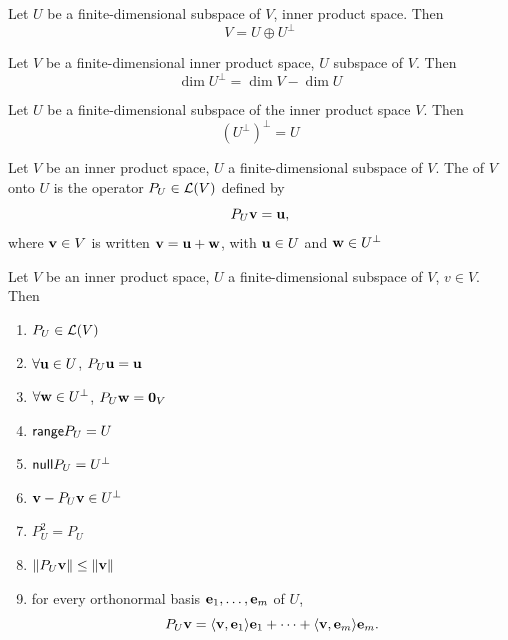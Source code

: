 \documentclass[aspectratio=169]{beamer}
\begin{document}
\begin{frame}
\begin{theorem}
Let $U$ be a finite-dimensional subspace of $V$, inner product space. Then
\[
V=U\oplus U^\perp 
\]
\end{theorem}

\begin{theorem}
Let $V$ be a finite-dimensional inner product space, $U$ subspace of $V$. Then
\[
\dim U^\perp=\dim V-\dim U
\]
\end{theorem}

\begin{theorem}
Let $U$ be a finite-dimensional subspace of the inner product space $V$. Then
\[
\left(U^\perp\right)^\perp = U
\]
\end{theorem}
\end{frame}


\begin{frame}
\begin{definition}
Let $V$ be an inner product space, $U$ a finite-dimensional subspace of $V$. The  of $V$ onto $U$ is the operator $P_U\in\mathcal{L}(V)$ defined by
\[
P_U\mathbf{v}=\mathbf{u},
\]
where $\mathbf{v}\in V$ is written $\mathbf{v}=\mathbf{u}+\mathbf{w}$, with $\mathbf{u}\in U$ and $\mathbf{w}\in U^\perp$
\end{definition}
\end{frame}

\begin{frame}
\begin{importantproperty}
Let $V$ be an inner product space, $U$ a finite-dimensional subspace of $V$, $v\in V$. Then
\begin{enumerate}
\item $P_U\in\mathcal{L}(V)$
\item $\forall\mathbf{u}\in U$, $P_U\mathbf{u}=\mathbf{u}$
\item $\forall\mathbf{w}\in U^\perp$, $P_U\bw=\b0_V$
\item $\mathsf{range} P_U=U$
\item $\mathsf{null} P_U=U^\perp$
\item $\mathbf{v}-P_U\mathbf{v}\in U^\perp$
\item $P_U^2=P_U$
\item $\|P_U\mathbf{v}\|\leq \|\mathbf{v}\|$
\item for every orthonormal basis $\mathbf{e}_1,\ldots,\mathbf{e}_m$ of $U$,
\[
P_U\mathbf{v}=\langle\mathbf{v},\mathbf{e}_1\rangle\mathbf{e}_1+\cdots+\langle\mathbf{v},\mathbf{e}_m\rangle\mathbf{e}_m.
\]
\end{enumerate}
\end{importantproperty}
\end{frame}
\end{document}
